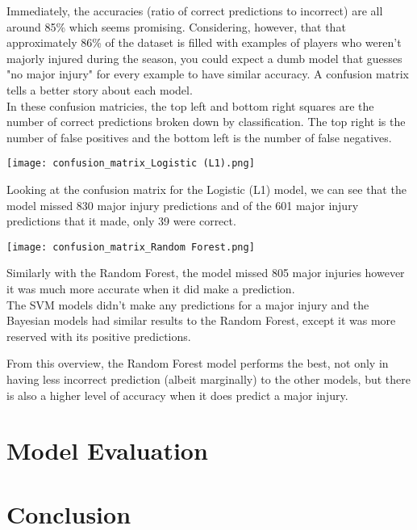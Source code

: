 \documentclass{article}
\begin{document}
Immediately, the accuracies (ratio of correct predictions to incorrect) are all around 85\%
which seems promising. Considering, however, that that approximately 86\% of the  dataset is filled 
with examples of players who weren't majorly injured during the season, you could expect a dumb model that  
guesses "no major injury" for every example to have similar accuracy. A confusion matrix
tells a better story about each model.\\

In these confusion matricies, the top left and bottom right squares are the number of correct predictions
broken down by classification. The top right is the number of false positives and the  
bottom left is the number of false negatives.\\

\begin{center}
    \texttt{[image: confusion\_matrix\_Logistic (L1).png]}
\end{center}

Looking at the confusion matrix for the Logistic (L1) model, we can see 
that the model missed 830 major injury predictions and of the 601
major injury predictions that it made, only 39 were correct.

\begin{center}
    \texttt{[image: confusion\_matrix\_Random Forest.png]}
\end{center}

Similarly with the Random Forest, the model missed 805 major injuries
however it was much more accurate when it did make a prediction.\\

The SVM models didn't make any predictions for a major injury and
the Bayesian models had similar results to the Random Forest, except 
it was more reserved with its positive predictions.

From this overview, the Random Forest model performs the best, not only in having
less incorrect prediction (albeit marginally) to the other models, but 
there is also a higher level of accuracy when it does predict a major injury.

\section*{Model Evaluation}



\section*{Conclusion}
\end{document}
